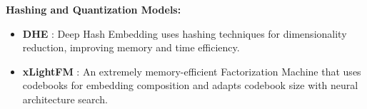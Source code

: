     \textbf{Hashing and Quantization Models:}
        \begin{itemize}[leftmargin=*,align=left]
            \item \textbf{DHE} \cite{DHE}: Deep Hash Embedding uses hashing techniques for dimensionality reduction, improving memory and time efficiency.
            \item \textbf{xLightFM} \cite{xLightFM}: An extremely memory-efficient Factorization Machine that uses codebooks for embedding composition and adapts codebook size with neural architecture search.
        \end{itemize}
         




